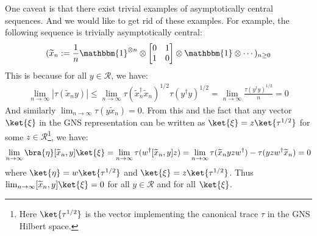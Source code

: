 \documentclass[a4paper,11pt]{article}
\theoremstyle{definition}
\numberwithin{equation}{section}
\begin{document}
One caveat is that there exist trivial examples of asymptotically central sequences. And we would like to get rid of these examples. For example, the following sequence is trivially asymptotically central:
\begin{equation}
    (\widetilde{x}_n:=\frac{1}{n}\mathbbm{1}^{\otimes n}\otimes\begin{bmatrix}
        0 & 1 \\ 1 & 0
    \end{bmatrix}\otimes\mathbbm{1}\otimes\cdots)_{n\geq 0}
\end{equation}
This is because for all $y\in\mathcal{R}$, we have:
\begin{eqnarray}
    \lim_{n\rightarrow\infty}|\tau(\widetilde{x}_ny)|\leq\lim_{n\rightarrow\infty}\tau(\widetilde{x}_n^\dagger\widetilde{x}_n)^{1/2}\tau(y^\dagger y)^{1/2} = \lim_{n\rightarrow\infty}\frac{\tau(y^\dagger y)^{1/2}}{n} = 0
\end{eqnarray}
And similarly $\lim_{n\rightarrow\infty}\tau(y\widetilde{x}_n) = 0$. From this and the fact that any vector $\ket{\xi}$ in the GNS representation can be written as $\ket{\xi} = z\ket{\tau^{1/2}}$ for some $z\in\mathcal{R}$\footnote{Here $\ket{\tau^{1/2}}$ is the vector implementing the canonical trace $\tau$ in the GNS Hilbert space.}, we have:
\begin{equation}
    \lim_{n\rightarrow\infty}\bra{\eta}[\widetilde{x}_n,y]\ket{\xi} = \lim_{n\rightarrow\infty}\tau(w^\dagger[\widetilde{x}_n,y]z) = \lim_{n\rightarrow\infty}\tau(\widetilde{x}_nyzw^\dagger) - \tau(yzw^\dagger\widetilde{x}_n) = 0
\end{equation}
where $\ket{\eta}  = w\ket{\tau^{1/2}}$ and $\ket{\xi} = z\ket{\tau^{1/2}}$. Thus $\lim_{n\rightarrow\infty}[\widetilde{x}_n,y]\ket{\xi} = 0$ for all $y\in\mathcal{R}$ and for all $\ket{\xi}$. 
\end{document}
